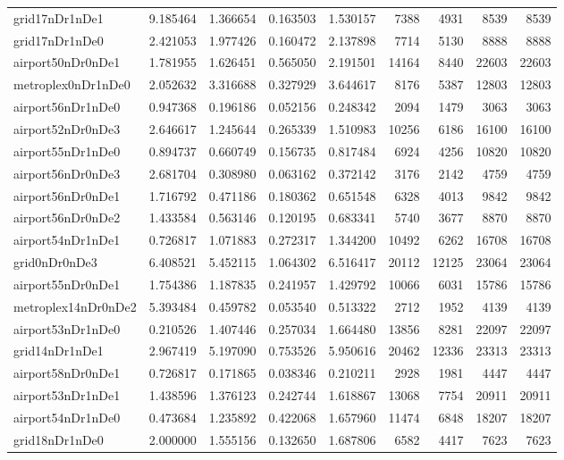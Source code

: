 \begin{longtable}{|l|r|r|r|r|r|r|r|r|}
grid17nDr1nDe1 & 9.185464 & 1.366654 & 0.163503 & 1.530157 & 7388 & 4931 & 8539 & 8539 \\
grid17nDr1nDe0 & 2.421053 & 1.977426 & 0.160472 & 2.137898 & 7714 & 5130 & 8888 & 8888 \\
airport50nDr0nDe1 & 1.781955 & 1.626451 & 0.565050 & 2.191501 & 14164 & 8440 & 22603 & 22603 \\
metroplex0nDr1nDe0 & 2.052632 & 3.316688 & 0.327929 & 3.644617 & 8176 & 5387 & 12803 & 12803 \\
airport56nDr1nDe0 & 0.947368 & 0.196186 & 0.052156 & 0.248342 & 2094 & 1479 & 3063 & 3063 \\
airport52nDr0nDe3 & 2.646617 & 1.245644 & 0.265339 & 1.510983 & 10256 & 6186 & 16100 & 16100 \\
airport55nDr1nDe0 & 0.894737 & 0.660749 & 0.156735 & 0.817484 & 6924 & 4256 & 10820 & 10820 \\
airport56nDr0nDe3 & 2.681704 & 0.308980 & 0.063162 & 0.372142 & 3176 & 2142 & 4759 & 4759 \\
airport56nDr0nDe1 & 1.716792 & 0.471186 & 0.180362 & 0.651548 & 6328 & 4013 & 9842 & 9842 \\
airport56nDr0nDe2 & 1.433584 & 0.563146 & 0.120195 & 0.683341 & 5740 & 3677 & 8870 & 8870 \\
airport54nDr1nDe1 & 0.726817 & 1.071883 & 0.272317 & 1.344200 & 10492 & 6262 & 16708 & 16708 \\
grid0nDr0nDe3 & 6.408521 & 5.452115 & 1.064302 & 6.516417 & 20112 & 12125 & 23064 & 23064 \\
airport55nDr0nDe1 & 1.754386 & 1.187835 & 0.241957 & 1.429792 & 10066 & 6031 & 15786 & 15786 \\
metroplex14nDr0nDe2 & 5.393484 & 0.459782 & 0.053540 & 0.513322 & 2712 & 1952 & 4139 & 4139 \\
airport53nDr1nDe0 & 0.210526 & 1.407446 & 0.257034 & 1.664480 & 13856 & 8281 & 22097 & 22097 \\
grid14nDr1nDe1 & 2.967419 & 5.197090 & 0.753526 & 5.950616 & 20462 & 12336 & 23313 & 23313 \\
airport58nDr0nDe1 & 0.726817 & 0.171865 & 0.038346 & 0.210211 & 2928 & 1981 & 4447 & 4447 \\
airport53nDr1nDe1 & 1.438596 & 1.376123 & 0.242744 & 1.618867 & 13068 & 7754 & 20911 & 20911 \\
airport54nDr1nDe0 & 0.473684 & 1.235892 & 0.422068 & 1.657960 & 11474 & 6848 & 18207 & 18207 \\
grid18nDr1nDe0 & 2.000000 & 1.555156 & 0.132650 & 1.687806 & 6582 & 4417 & 7623 & 7623 \\

\end{longtable}
